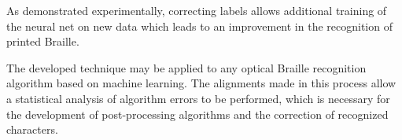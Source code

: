\documentclass{main.tex}[subfiles]
\begin{document}
As demonstrated experimentally, correcting labels allows additional training of the neural net on new data which leads to an improvement in the recognition of printed Braille.

The developed technique may be applied to any optical Braille recognition algorithm based on machine learning.
The alignments made in this process allow a statistical analysis of algorithm errors to be performed, which is necessary for the development of post-processing algorithms and the correction of recognized characters.

\newpage
\end{document}
